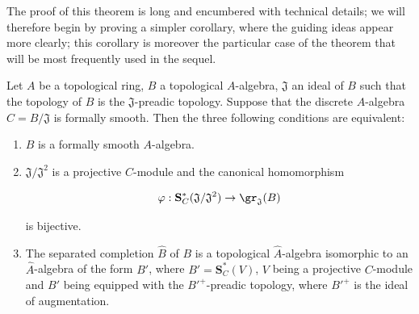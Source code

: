 The proof of this theorem is long and encumbered with technical details;
we will therefore begin by proving a simpler corollary, where the guiding ideas appear more clearly;
this corollary is moreover the particular case of the theorem  that will be most frequently used in the sequel.

\begin{corollary}[19.5.4]
\label{0.19.5.4}
Let $A$ be a topological ring, $B$ a topological $A$-algebra, $\mathfrak{J}$ an ideal of $B$ such that the topology of $B$ is the $\mathfrak{J}$-preadic topology.
Suppose that the discrete $A$-algebra $C=B/\mathfrak{J}$ is formally smooth.
Then the three following conditions are equivalent:
\begin{enumerate}
  \item[a)] $B$ is a formally smooth $A$-algebra.
  \item[b)] $\mathfrak{J}/\mathfrak{J}^2$ is a projective $C$-module and the canonical homomorphism
  
\[
\varphi:\mathbf{S}_C^*(\mathfrak{J}/\mathfrak{J}^2) \to \gr_\mathfrak{J}(B)
\]

  is bijective.
  \item[c)] The separated completion $\widehat{B}$ of $B$ is a topological $\widehat{A}$-algebra isomorphic to an $\widehat{A}$-algebra of the form $B'$, where $B'=\mathbf{S}_C^*(V)$, $V$ being a projective $C$-module and $B'$ being equipped with the ${B'}^+$-preadic topology, where ${B'}^+$ is the ideal of augmentation.
\end{enumerate}
\end{corollary}

